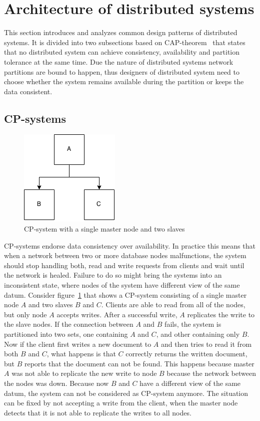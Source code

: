 \section{Architecture of distributed systems}

This section introduces and analyzes common design patterns of distributed
systems. It is divided into two subsections based on
CAP-theorem~\cite{gilbert2002brewer} that states that no distributed system can
achieve consistency, availability and partition tolerance at the same time. Due
the nature of distributed systems network partitions are bound to happen, thus
designers of distributed system need to choose whether the system remains
available during the partition or keeps the data consistent.

\subsection{CP-systems}

\begin{figure}[h!]
  \centering
    \includegraphics{pictures/cp_system.png}
  \caption{CP-system with a single master node and two slaves}
\label{cpimage}
\end{figure}

CP-systems endorse data consistency over availability. In practice this means
that when a network between two or more database nodes malfunctions, the
system should stop handling both, read and write requests from clients and wait
until the network is healed. Failure to do so might bring the systems into an
inconsistent state, where nodes of the system have different view of the same
datum. Consider figure~\ref{cpimage} that shows a CP-system consisting of a
single master node \(A\) and two slaves \(B\) and \(C\). Clients are able to
read from all of the nodes, but only node \(A\) accepts writes. After a
successful write, \(A\) replicates the write to the slave nodes. If the
connection between \(A\) and \(B\) fails, the system is partitioned into two
sets, one containing \(A\) and \(C\), and other containing only \(B\). Now if
the client first writes a new document to \(A\) and then tries to read it from
both \(B\) and \(C\), what happens is that \(C\) correctly returns the written
document, but \(B\) reports that the document can not be found. This happens
because master \(A\) was not able to replicate the new write to node \(B\)
because the network between the nodes was down. Because now \(B\) and \(C\) have
a different view of the same datum, the system can not be considered as
CP-system anymore. The situation can be fixed by not accepting a write from the
client, when the master node detects that it is not able to replicate the writes
to all nodes. 

